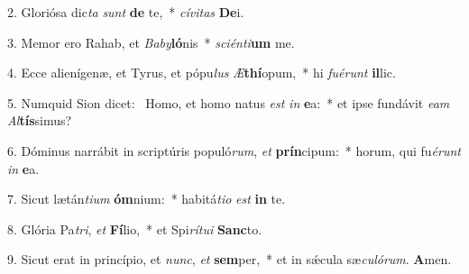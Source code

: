 2. Gloriósa dic\textit{ta} \textit{sunt} \textbf{de} te,~*  \textit{cí}\textit{vi}\textit{tas} \textbf{De}i.\

3. Memor ero Rahab, et \textit{Ba}\textit{by}\textbf{ló}nis~*  \textit{sci}\textit{én}\textit{ti}\textbf{um} me.\

4. Ecce alienígenæ, et Tyrus, et pópu\textit{lus} \textit{Æ}\textbf{thí}opum,~*  hi \textit{fu}\textit{é}\textit{runt} \textbf{il}lic.\

5. Numquid Sion dicet: \dag\  Homo, et homo natus \textit{est} \textit{in} \textbf{e}a:~*  et ipse fundávit \textit{e}\textit{am} \textit{Al}\textbf{tís}simus?\

6. Dóminus narrábit in scriptúris populó\textit{rum}, \textit{et} \textbf{prín}cipum:~*  horum, qui fu\textit{é}\textit{runt} \textit{in} \textbf{e}a.\

7. Sicut lætán\textit{ti}\textit{um} \textbf{óm}nium:~*  habitá\textit{ti}\textit{o} \textit{est} \textbf{in} te.\

8. Glória Pa\textit{tri}, \textit{et} \textbf{Fí}lio,~*  et Spi\textit{rí}\textit{tu}\textit{i} \textbf{Sanc}to.\

9. Sicut erat in princípio, et \textit{nunc}, \textit{et} \textbf{sem}per,~*  et in sǽcula sæ\textit{cu}\textit{ló}\textit{rum}. \textbf{A}men.\

